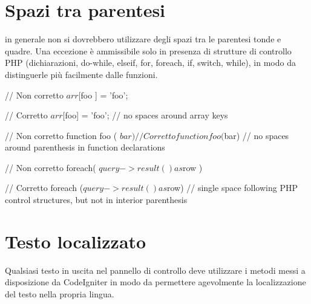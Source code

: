 
\section*{Spazi tra parentesi}
in generale non si dovrebbero utilizzare degli spazi tra le parentesi tonde e quadre. Una eccezione è ammissibile solo in presenza di strutture di controllo \ac{PHP} (dichiarazioni, do-while, elseif, for, foreach, if, switch, while), in modo da distinguerle più facilmente dalle funzioni.

\begin{code}
// Non corretto
$arr[ $foo ] = 'foo';

// Corretto
$arr[$foo] = 'foo'; // no spaces around array keys


// Non corretto
function foo ( $bar )
{

}

// Corretto
function foo($bar) // no spaces around parenthesis in function declarations
{

}


// Non corretto
foreach( $query->result() as $row )

// Corretto
foreach ($query->result() as $row) // single space following PHP control structures, but not in interior parenthesis
\end{code}

\section*{Testo localizzato}
Qualsiasi testo in uscita nel pannello di controllo deve utilizzare i metodi messi a disposizione da CodeIgniter in modo da permettere agevolmente la localizzazione del testo nella propria lingua.

